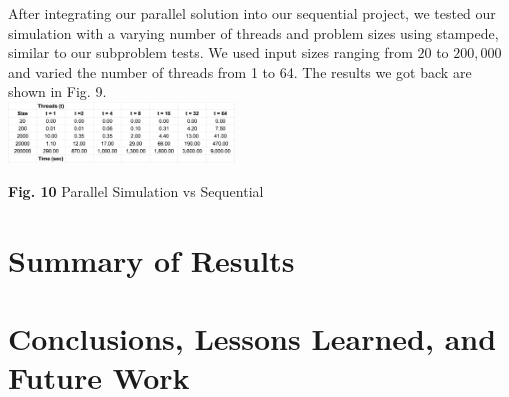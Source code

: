 \documentclass[conference]{IEEEtran}
\begin{document}
\hspace*{.2cm} After integrating our parallel solution into our sequential project, we tested our simulation with a varying number of threads and problem sizes using stampede, similar to our subproblem tests. We used input sizes ranging from $20$ to $200,000$ and varied the number of threads from 1 to 64. The results we got back are shown in Fig. 9. \\

\includegraphics[width=0.45\textwidth]{results}
\begin{center}
	\textbf{Fig. 10} Parallel Simulation vs Sequential \\
\end{center}


\section{Summary of Results}
\lipsum[4]

\section{Conclusions, Lessons Learned, and Future Work}
\lipsum[5]



\end{document}
